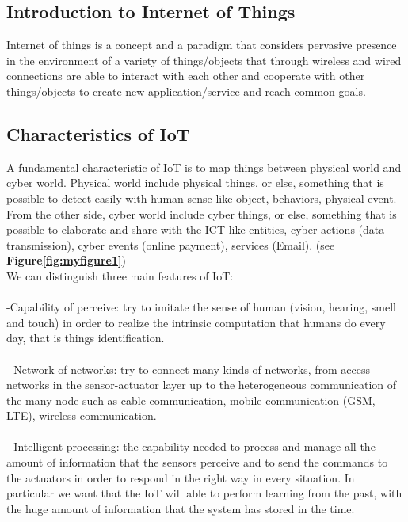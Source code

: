 \documentclass[a4paper,10pt]{article}
\begin{document}
\vspace{4ex}	%
\begin{multicols}{2}

\section{Introduction to Internet of Things}

Internet of things is a concept and a paradigm that considers pervasive presence in the environment of a variety of things/objects that through wireless and wired connections are able to interact with each other and cooperate with other things/objects to create new application/service and reach common goals. \cite{Ovidiu13Internet}  




\subsection{Characteristics of IoT}

 A fundamental characteristic of IoT is to map things between
 physical world and cyber world. Physical world include physical
 things, or else, something that is possible to detect easily with
 human sense like object, behaviors, physical event. From the 
other side, cyber world include cyber things, or else,  something
 that is possible to elaborate and share with the ICT like entities,
 cyber actions (data transmission), cyber events (online payment), 
services (Email). (see {\bf Figure\ref{fig:myfigure1}})\\


We can distinguish three main features of IoT:\\\\
-Capability of perceive: try to imitate the sense of human
 (vision, hearing, smell and touch) in order to realize the intrinsic 
computation that humans do every day, that is things identification.\\\\
- Network of networks: try to connect many kinds of networks, from 
access networks in the sensor-actuator layer up to the heterogeneous 
communication of the many node such as cable communication, mobile 
communication (GSM, LTE),  wireless communication.\\\\
- Intelligent processing:  the capability needed to process and manage 
all the amount of information that the sensors perceive and to send the
 commands to the actuators in order to respond in the right way in
 every situation. In particular we want that the IoT will able to
 perform learning from the past, with the huge amount of information 
that the system has stored in the time.



\end{multicols}
\end{document}
